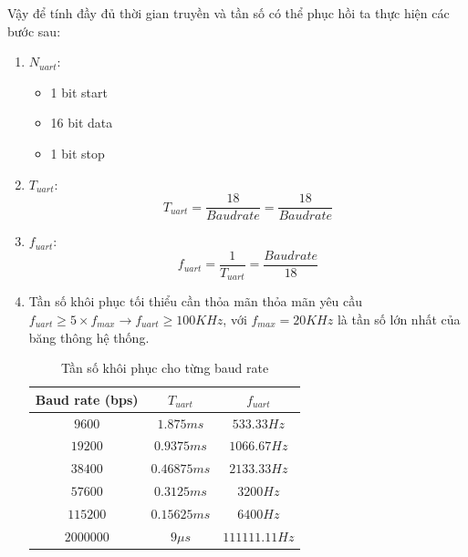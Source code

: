 Vậy để tính đầy đủ thời gian truyền và tần số có thể phục hồi ta thực hiện các bước sau:
\begin{enumerate}[label = \arabic *)]
	\item $N_{uart}$: 
		\begin{itemize}[label = -]
			\item 1 bit start
			\item 16 bit data
			\item 1 bit stop
		\end{itemize}
	\item $T_{uart}$: \[ T_{uart} = \dfrac{18}{Baud rate} = \dfrac{18}{Baud rate} \]
	\item $f_{uart}$: \[ f_{uart} = \dfrac{1}{T_{uart}} = \dfrac{Baud rate}{18} \]
	\item Tần số khôi phục tối thiểu cần thỏa mãn thỏa mãn yêu cầu $f_{uart} \geq 5\times f_{max} \rightarrow f_{uart} \geq 100KHz$, với $f_{max} = 20KHz$ là tần số lớn nhất của băng thông hệ thống.
	
		\begin{table}[H]
			\centering
			\begin{tabular}{|c|c|c|}
				\hline
				Baud rate (bps) & $T_{uart}$ & $f_{uart}$ \\
				\hline
				$9600$ & $1.875 ms$ & $533.33 Hz$ \\
				\hline
				$19200$ & $0.9375 ms$ & $1066.67 Hz$\\
				\hline
				$38400$ & $0.46875 ms$ & $2133.33 Hz$ \\
				\hline
				$57600$ & $0.3125 ms$ & $3200 Hz$\\
				\hline
				$115200$ & $0.15625 ms$ & $6400 Hz$ \\
				\hline
				$200000$0 & $9 \mu s$ & $111111.11 Hz$ \\
				\hline
			\end{tabular}
			\caption{Tần số khôi phục cho từng baud rate}
		\end{table}
\end{enumerate}